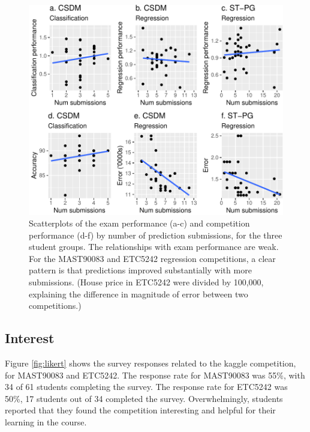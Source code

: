 \documentclass[12pt]{article}
\begin{document}
\begin{figure}
\centering
\includegraphics{paper-kaggle_files/figure-latex/numsubmition-1.pdf}
\caption{\label{fig:numsubmition} Scatterplots of the exam performance
(a-c) and competition performance (d-f) by number of prediction
submissions, for the three student groups. The relationships with exam
performance are weak. For the MAST90083 and ETC5242 regression
competitions, a clear pattern is that predictions improved substantially
with more submissions. (House price in ETC5242 were divided by 100,000,
explaining the difference in magnitude of error between two
competitions.)}
\end{figure}

\subsection{Interest}\label{interest-1}

Figure \ref{fig:likert} shows the survey responses related to the kaggle
competition, for MAST90083 and ETC5242. The response rate for MAST90083
was 55\%, with 34 of 61 students completing the survey. The response
rate for ETC5242 was 50\%, 17 students out of 34 completed the survey.
Overwhelmingly, students reported that they found the competition
interesting and helpful for their learning in the course.
\end{document}
